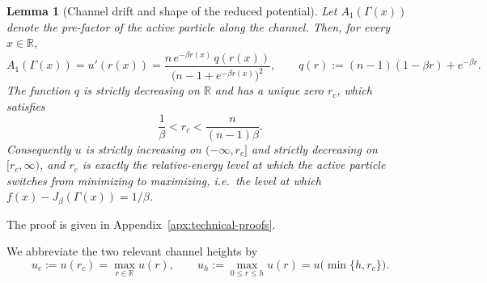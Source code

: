 \documentclass{article}
\theoremstyle{plain}
\newtheorem{lemma}[theorem]{Lemma}
\theoremstyle{definition}
\theoremstyle{remark}
\newcommand{\prefactor}[2]{A_{#1}(#2)}
\newcommand{\R}{\mathbb{R}}
\begin{document}
\begin{lemma}[Channel drift and shape of the reduced potential]
\label{lem:channel-drift}
Let $\prefactor{1}{\Gamma(x)}$ denote the pre-factor of the active particle along the channel. Then, for every $x\in\R$,
\begin{equation}
    \prefactor{1}{\Gamma(x)}=u'(r(x))
    =\frac{n\,e^{-\beta r(x)}\,q(r(x))}{\bigl(n-1+e^{-\beta r(x)}\bigr)^{2}},
    \qquad
    q(r):=(n-1)(1-\beta r)+e^{-\beta r}.
    \label{eq:a1-equals-uprime}
\end{equation}
The function $q$ is strictly decreasing on $\R$ and has a unique zero $r_c$, which satisfies
\begin{equation}
    \frac1\beta<r_c<\frac{n}{(n-1)\beta}.
    \label{eq:rc-location}
\end{equation}
Consequently $u$ is strictly increasing on $(-\infty,r_c]$ and strictly decreasing on $[r_c,\infty)$, and $r_c$ is exactly the relative-energy level at which the active particle switches from minimizing to maximizing, i.e.\ the level at which $f(x)-J_\beta(\Gamma(x))=1/\beta$.
\end{lemma}

\noindent The proof is given in Appendix~\ref{apx:technical-proofs}.

We abbreviate the two relevant channel heights by
\begin{equation}
    u_c:=u(r_c)=\max_{r\in\R}u(r),
    \qquad
    u_h:=\max_{0\le r\le h}u(r)=u\bigl(\min\{h,r_c\}\bigr).
    \label{eq:channel-heights}
\end{equation}
\end{document}
